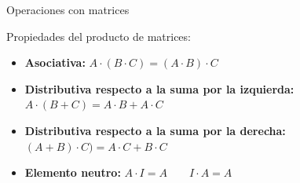 \documentclass[9pt]{beamer}
\begin{document}
\begin{frame}{Operaciones con matrices}

Propiedades del producto de matrices:

\pause
\begin{itemize}[<+- |alert@+>]
\item \textbf{Asociativa:} $A \cdot(B \cdot C)= (A \cdot B) \cdot C$
\item \textbf{Distributiva respecto a la suma por la izquierda:} $A \cdot (B + C)= A \cdot B + A \cdot C$
\item \textbf{Distributiva respecto a la suma por la derecha:} $(A  +B )\cdot  C)= A \cdot C + B \cdot C$
\item \textbf{Elemento neutro:} $A \cdot I = A \qquad I \cdot A = A$
\end{itemize}


\end{frame}
\end{document}
